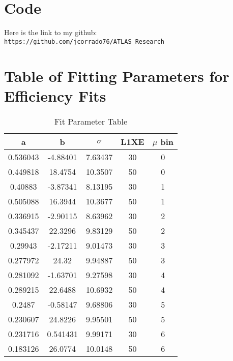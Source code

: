 \documentclass{sfuthesis}
\begin{document}
%
%
%
%
%

\begin{appendices} %
	\chapter{Code}
    Here is the link to my github:\\
    \texttt{https://github.com/jcorrado76/ATLAS\_Research}
    \chapter{Table of Fitting Parameters for Efficiency Fits}
        \begin{table}[ht]
        \centering
        \begin{tabular}{|c|c|c|c|c|}
        \hline\hline
        a & b & $\sigma$ & L1XE & $\mu$ bin\\ 
        \hline
        0.536043 & -4.88401 & 7.63437 & 30 & 0\\ 
        0.449818 & 18.4754 & 10.3507 & 50 & 0\\ 
        0.40883 & -3.87341 & 8.13195 & 30 & 1\\ 
        0.505088 & 16.3944 & 10.3677 & 50 & 1\\ 
        0.336915 & -2.90115 & 8.63962 & 30 & 2\\ 
        0.345437 & 22.3296 & 9.83129 & 50 & 2\\ 
        0.29943 & -2.17211 & 9.01473 & 30 & 3\\ 
        0.277972 & 24.32 & 9.94887 & 50 & 3\\ 
        0.281092 & -1.63701 & 9.27598 & 30 & 4\\ 
        0.289215 & 22.6488 & 10.6932 & 50 & 4\\ 
        0.2487 & -0.58147 & 9.68806 & 30 & 5\\ 
        0.230607 & 24.8226 & 9.95501 & 50 & 5\\ 
        0.231716 & 0.541431 & 9.99171 & 30 & 6\\ 
        0.183126 & 26.0774 & 10.0148 & 50 & 6\\ 
        \hline
        \end{tabular}
        \caption{\label{tab:parameter fit values}Fit Parameter Table}
        \end{table}
\end{appendices}
\end{document}
